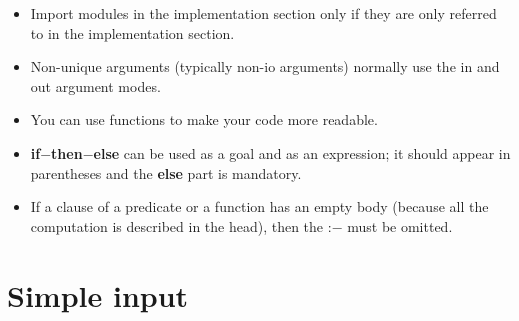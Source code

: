 \documentclass[a4paper,11pt,notitlepage,onecolumn]{book}
\begin{document}
\begin{itemize}
\item Import modules in the implementation section only if they are only
referred to in the implementation section.
\item Non-unique arguments (typically non-\textsf{io} arguments) normally use the \textsf{in}
and \textsf{out} argument modes.
\item You can use functions to make your code more readable.
\item \textsf{\textbf{if}{\ensuremath{-}}\textbf{then}{\ensuremath{-}}\textbf{else}} can be used as a goal and as an expression; it should
appear in parentheses and the \textsf{\textbf{else}} part is mandatory.
\item If a clause of a predicate or a function has an empty body (because
all the computation is described in the head), then the \textsf{:{\ensuremath{-}}} must be omitted.
\end{itemize}





\newpage





\section{Simple input}
\end{document}
